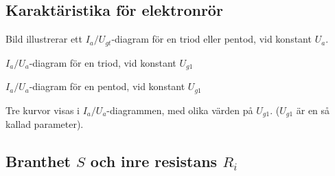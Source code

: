 \subsection{Karaktäristika för elektronrör}

Bild  illustrerar ett \(I_a/U_{gt}\)-diagram för en triod
eller pentod, vid konstant \(U_a\).

\(I_a/U_a\)-diagram för en triod, vid konstant \(U_{g1}\)

\(I_a/U_a\)-diagram för en pentod, vid konstant \(U_{g1}\)

Tre kurvor visas i \(I_a/U_a\)-diagrammen, med olika värden på
\(U_{g1}\). (\(U_{g1}\) är en så kallad parameter).

\newpage
{}

\subsection{Branthet $S$ och inre resistans $R_i$}

